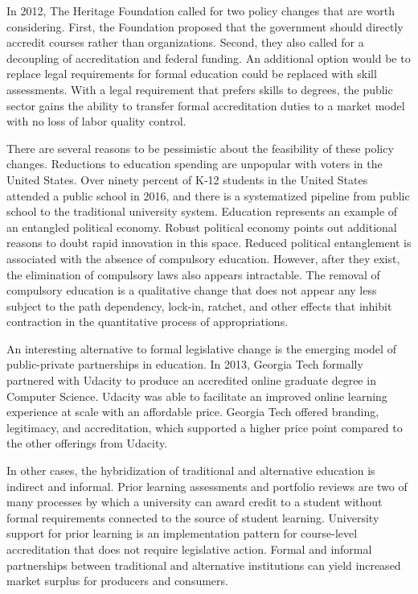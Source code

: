 \documentclass[review]{elsarticle}
\begin{document}
In 2012, The Heritage Foundation called for two policy changes that are worth considering.
First, the Foundation proposed that the government should directly accredit courses rather than organizations\cite{burke2012accreditation}.
Second, they also called for a decoupling of accreditation and federal funding.
An additional option would be to replace legal requirements for formal education could be replaced with skill assessments.
With a legal requirement that prefers skills to degrees,
the public sector gains the ability to transfer formal accreditation duties to a market model with no loss of labor quality control.

There are several reasons to be pessimistic about the feasibility of these policy changes.
Reductions to education spending are unpopular with voters in the United States.
Over ninety percent of K-12 students in the United States attended a public school in 2016\cite{us2019digest},
and there is a systematized pipeline from public school to the traditional university system.
Education represents an example of an entangled political economy\cite{wagner2014entangled}.
Robust political economy points out additional reasons to doubt rapid innovation in this space\cite{boettke2004liberalism}.
Reduced political entanglement is associated with the absence of compulsory education.
However, after they exist, the elimination of compulsory laws also appears intractable.
The removal of compulsory education is a qualitative change that does not appear any less subject to the path dependency,
lock-in, ratchet, and other effects that inhibit contraction in the quantitative process of appropriations.

An interesting alternative to formal legislative change is the emerging model of public-private partnerships in education.
In 2013, Georgia Tech formally partnered with Udacity to produce an accredited online graduate degree in Computer Science\cite{empson_2013}.
Udacity was able to facilitate an improved online learning experience at scale with an affordable price.
Georgia Tech offered branding, legitimacy, and accreditation, which supported a higher price point compared to the other offerings from Udacity.

In other cases, the hybridization of traditional and alternative education is indirect and informal.
Prior learning assessments and portfolio reviews are two of many processes by which a university can award credit to a student
without formal requirements connected to the source of student learning\cite{conrad2008building}.
University support for prior learning is an implementation pattern for course-level accreditation that does not require legislative action.
Formal and informal partnerships between traditional and alternative institutions can yield increased market surplus for producers and consumers.
\end{document}
